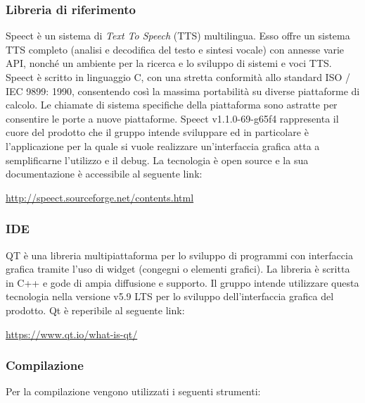 \documentclass[../NormediProgetto.tex]{subfiles}
\begin{document}
	\subsubsection{Libreria di riferimento}
	Speect è un sistema di \textit{Text To Speech} (TTS) multilingua. Esso offre un sistema TTS completo (analisi e decodifica del testo e sintesi vocale) con annesse varie API, nonché un ambiente per la ricerca e lo sviluppo di sistemi e voci TTS. Speect è scritto in linguaggio C, con una stretta conformità allo standard ISO / IEC 9899: 1990, consentendo così la massima portabilità su diverse piattaforme di calcolo. Le chiamate di sistema specifiche della piattaforma sono astratte per consentire le porte a nuove piattaforme. Speect v1.1.0-69-g65f4 rappresenta il cuore del prodotto che il gruppo intende sviluppare ed in particolare è l'applicazione per la quale si vuole realizzare un'interfaccia grafica atta a semplificarne l'utilizzo e il debug. La tecnologia è open source e la sua documentazione è accessibile al seguente link:
	\begin{center}
		\url{http://speect.sourceforge.net/contents.html}
	\end{center}

	\subsubsection{IDE}

	QT è una libreria multipiattaforma per lo sviluppo di programmi con interfaccia grafica tramite l'uso di widget (congegni o elementi grafici). La libreria è scritta in C++ e gode di ampia diffusione e supporto. Il gruppo intende utilizzare questa tecnologia nella versione v5.9 LTS per lo sviluppo dell'interfaccia grafica del prodotto. Qt è reperibile al seguente link:
	\begin{center}
		\centerline{\url{https://www.qt.io/what-is-qt/}}
	\end{center}

	\subsubsection{Compilazione}

	Per la compilazione vengono utilizzati i seguenti strumenti:
\end{document}
